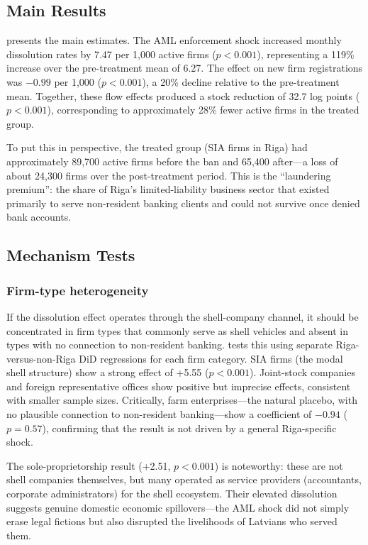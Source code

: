 \documentclass[12pt]{article}
\begin{document}
\subsection{Main Results}

 presents the main estimates. The AML enforcement shock increased monthly dissolution rates by 7.47 per 1,000 active firms ($p < 0.001$), representing a 119\% increase over the pre-treatment mean of 6.27. The effect on new firm registrations was $-0.99$ per 1,000 ($p < 0.001$), a 20\% decline relative to the pre-treatment mean. Together, these flow effects produced a stock reduction of 32.7 log points ($p < 0.001$), corresponding to approximately 28\% fewer active firms in the treated group.

To put this in perspective, the treated group (SIA firms in Riga) had approximately 89,700 active firms before the ban and 65,400 after---a loss of about 24,300 firms over the post-treatment period. This is the ``laundering premium'': the share of Riga's limited-liability business sector that existed primarily to serve non-resident banking clients and could not survive once denied bank accounts.



\subsection{Mechanism Tests}

\subsubsection*{Firm-type heterogeneity} If the dissolution effect operates through the shell-company channel, it should be concentrated in firm types that commonly serve as shell vehicles and absent in types with no connection to non-resident banking.  tests this using separate Riga-versus-non-Riga DiD regressions for each firm category. SIA firms (the modal shell structure) show a strong effect of +5.55 ($p < 0.001$). Joint-stock companies and foreign representative offices show positive but imprecise effects, consistent with smaller sample sizes. Critically, farm enterprises---the natural placebo, with no plausible connection to non-resident banking---show a coefficient of $-0.94$ ($p = 0.57$), confirming that the result is not driven by a general Riga-specific shock.

The sole-proprietorship result (+2.51, $p < 0.001$) is noteworthy: these are not shell companies themselves, but many operated as service providers (accountants, corporate administrators) for the shell ecosystem. Their elevated dissolution suggests genuine domestic economic spillovers---the AML shock did not simply erase legal fictions but also disrupted the livelihoods of Latvians who served them.
\end{document}
